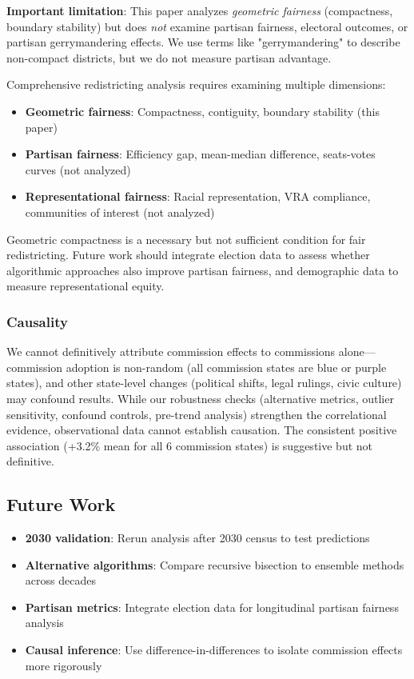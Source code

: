 \textbf{Important limitation}: This paper analyzes \textit{geometric fairness} (compactness, boundary stability) but does \textit{not} examine partisan fairness, electoral outcomes, or partisan gerrymandering effects. We use terms like "gerrymandering" to describe non-compact districts, but we do not measure partisan advantage.

Comprehensive redistricting analysis requires examining multiple dimensions:
\begin{itemize}
    \item \textbf{Geometric fairness}: Compactness, contiguity, boundary stability (this paper)
    \item \textbf{Partisan fairness}: Efficiency gap, mean-median difference, seats-votes curves (not analyzed)
    \item \textbf{Representational fairness}: Racial representation, VRA compliance, communities of interest (not analyzed)
\end{itemize}

Geometric compactness is a necessary but not sufficient condition for fair redistricting. Future work should integrate election data to assess whether algorithmic approaches also improve partisan fairness, and demographic data to measure representational equity.

\subsubsection{Causality}

We cannot definitively attribute commission effects to commissions alone—commission adoption is non-random (all commission states are blue or purple states), and other state-level changes (political shifts, legal rulings, civic culture) may confound results. While our robustness checks (alternative metrics, outlier sensitivity, confound controls, pre-trend analysis) strengthen the correlational evidence, observational data cannot establish causation. The consistent positive association (+3.2\% mean for all 6 commission states) is suggestive but not definitive.

\subsection{Future Work}

\begin{itemize}
    \item \textbf{2030 validation}: Rerun analysis after 2030 census to test predictions
    \item \textbf{Alternative algorithms}: Compare recursive bisection to ensemble methods across decades
    \item \textbf{Partisan metrics}: Integrate election data for longitudinal partisan fairness analysis
    \item \textbf{Causal inference}: Use difference-in-differences to isolate commission effects more rigorously
\end{itemize}

